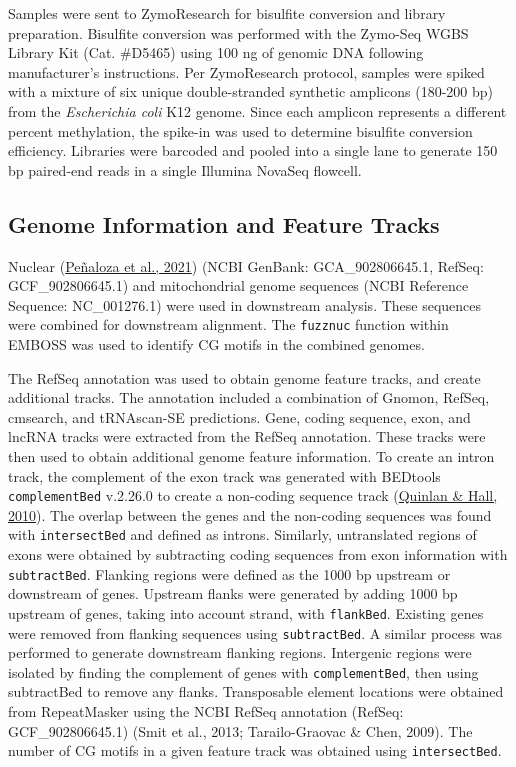 \documentclass [11pt, proquest] {uwthesis}[2015/03/03]
\begin{document}
Samples were sent to ZymoResearch for bisulfite conversion and library preparation. Bisulfite conversion was performed with the Zymo-Seq WGBS Library Kit (Cat. \#D5465) using 100 ng of genomic DNA following manufacturer's instructions. Per ZymoResearch protocol, samples were spiked with a mixture of six unique double-stranded synthetic amplicons (180-200 bp) from the \emph{Escherichia coli} K12 genome. Since each amplicon represents a different percent methylation, the spike-in was used to determine bisulfite conversion efficiency. Libraries were barcoded and pooled into a single lane to generate 150 bp paired-end reads in a single Illumina NovaSeq flowcell.

\hypertarget{genome-information-and-feature-tracks}{%
\subsection{Genome Information and Feature Tracks}\label{genome-information-and-feature-tracks}}

Nuclear (\protect\hyperlink{ref-Penaloza2021}{Peñaloza et al., 2021}) (NCBI GenBank: GCA\_902806645.1, RefSeq: GCF\_902806645.1) and mitochondrial genome sequences (NCBI Reference Sequence: NC\_001276.1) were used in downstream analysis. These sequences were combined for downstream alignment. The \texttt{fuzznuc} function within EMBOSS was used to identify CG motifs in the combined genomes.

The RefSeq annotation was used to obtain genome feature tracks, and create additional tracks. The annotation included a combination of Gnomon, RefSeq, cmsearch, and tRNAscan-SE predictions. Gene, coding sequence, exon, and lncRNA tracks were extracted from the RefSeq annotation. These tracks were then used to obtain additional genome feature information. To create an intron track, the complement of the exon track was generated with BEDtools \texttt{complementBed} v.2.26.0 to create a non-coding sequence track (\protect\hyperlink{ref-Quinlan2010}{Quinlan \& Hall, 2010}). The overlap between the genes and the non-coding sequences was found with \texttt{intersectBed} and defined as introns. Similarly, untranslated regions of exons were obtained by subtracting coding sequences from exon information with \texttt{subtractBed}. Flanking regions were defined as the 1000 bp upstream or downstream of genes. Upstream flanks were generated by adding 1000 bp upstream of genes, taking into account strand, with \texttt{flankBed}. Existing genes were removed from flanking sequences using \texttt{subtractBed}. A similar process was performed to generate downstream flanking regions. Intergenic regions were isolated by finding the complement of genes with \texttt{complementBed}, then using subtractBed to remove any flanks. Transposable element locations were obtained from RepeatMasker using the NCBI RefSeq annotation (RefSeq: GCF\_902806645.1) (Smit et al., 2013; Tarailo-Graovac \& Chen, 2009). The number of CG motifs in a given feature track was obtained using \texttt{intersectBed}.
\end{document}
